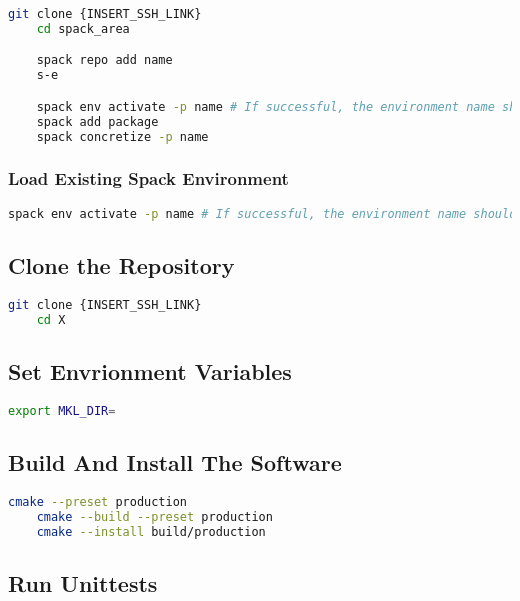 \documentclass[a4paper,12pt]{article}
\begin{document}
\begin{lstlisting}[language=bash]
    git clone {INSERT_SSH_LINK}
    cd spack_area 

    spack repo add name 
    s-e

    spack env activate -p name # If successful, the environment name should be visible
    spack add package 
    spack concretize -p name
\end{lstlisting}

\subsubsection{Load Existing Spack Environment} 

\begin{lstlisting}[language=bash]
    spack env activate -p name # If successful, the environment name should be visible
\end{lstlisting}

\subsection{Clone the Repository}

\begin{lstlisting}[language=bash]
    git clone {INSERT_SSH_LINK}
    cd X
\end{lstlisting}

\subsection{Set Envrionment Variables}

\begin{lstlisting}[language=bash]
    export MKL_DIR=
\end{lstlisting}

\subsection{Build And Install The Software}

\begin{lstlisting}[language=bash]
    cmake --preset production 
    cmake --build --preset production
    cmake --install build/production 
\end{lstlisting}

\subsection{Run Unittests}
\end{document}
